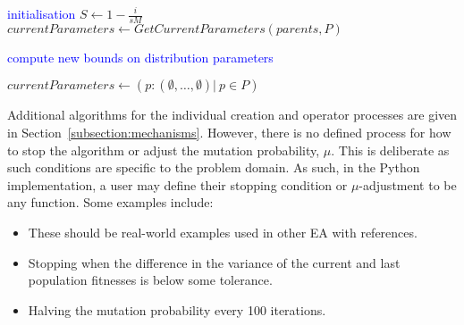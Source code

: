 \documentclass[10pt]{article}
\newcommand{\balg}{\begin{algorithm}[htbp]\singlespacing\DontPrintSemicolon}
\newcommand{\ealg}{\end{algorithm}\doublespacing}
\begin{document}
\balg%
\KwData{}
\KwResult{}\;

\textcolor{blue}{initialisation}\;
\(S \longleftarrow 1 - \frac{i}{s M}\)\;
\(currentParameters \longleftarrow GetCurrentParameters(parents, P)\)\;\;

\textcolor{blue}{compute new bounds on distribution parameters}\;
\caption{\(ReduceMutationSpace\)}
\ealg%

\balg%
\(%
    currentParameters \longleftarrow%
    \left(p: \left(\emptyset, \ldots, \emptyset\right) | \ p \in P\right)
\)\;
\caption{\(GetCurrentParameters\)}
\ealg%

Additional algorithms for the individual creation and operator processes are
given in Section~\ref{subsection:mechanisms}. However, there is no defined
process for how to stop the algorithm or adjust the mutation probability,
\(\mu\). This is deliberate as such conditions are specific to the problem
domain. As such, in the Python implementation, a user may define their stopping
condition or \(\mu\)-adjustment to be any function. Some examples include:

\begin{itemize}
    \item These should be real-world examples used in other EA with references.
    \item Stopping when the difference in the variance of the current and last
        population fitnesses is below some tolerance.
    \item Halving the mutation probability every 100 iterations.
\end{itemize}
        
\end{document}

